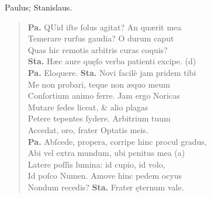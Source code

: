 \documentclass[a4paper,12pt]{article}
\begin{document}
Paulus; Stanislaus.
\begin{verse}
\textbf{Pa.} QUid iſte ſolus agitat? An quærit mea\\[0pt]
Temerare rurſus gaudia? O durum caput\\[0pt]
Quas hic remotis arbitris curas coquis?\\[0pt]
\textbf{Sta.} Hæc aure quęſo verba patienti excipe. (d)\footnotemark\\[0pt]
\textbf{Pa.} Eloquere. \textbf{Sta.} Novi facilè jam pridem tibi\\[0pt]
Me non probari, teque non æquo meum\\[0pt]
Conſortium animo ferre. Jam ergo Noricas\\[0pt]
Mutare ſedes liceat, \& alio plagas\\[0pt]
Petere tepentes ſydere. Arbitrium tuum\\[0pt]
Accedat, oro, frater Optatis meis.\\[0pt]
\textbf{Pa.} Abſcede, propera, corripe hinc procul gradus,\\[0pt]
Abi vel extra mundum, ubi penitus mea (a)\footnotemark\\[0pt]
Latere poſſis lumina: id cupio, id volo,\\[0pt]
Id poſco Numen. Amove hinc pedem ocyus\\[0pt]
Nondum recedis? \textbf{Sta.} Frater ęternum vale.\\[0pt]
\end{verse}
\end{document}
